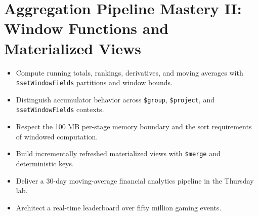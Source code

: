 \chapter{Aggregation Pipeline Mastery II: Window Functions and Materialized Views}
%

\begin{objectives}
\begin{itemize}
    \item Compute running totals, rankings, derivatives, and moving averages with \texttt{\$setWindowFields} partitions and window bounds.
    \item Distinguish accumulator behavior across \texttt{\$group}, \texttt{\$project}, and \texttt{\$setWindowFields} contexts.
    \item Respect the 100 MB per-stage memory boundary and the sort requirements of windowed computation.
    \item Build incrementally refreshed materialized views with \texttt{\$merge} and deterministic keys.
    \item Deliver a 30-day moving-average financial analytics pipeline in the Thursday lab.
    \item Architect a real-time leaderboard over fifty million gaming events.
\end{itemize}
\end{objectives}

